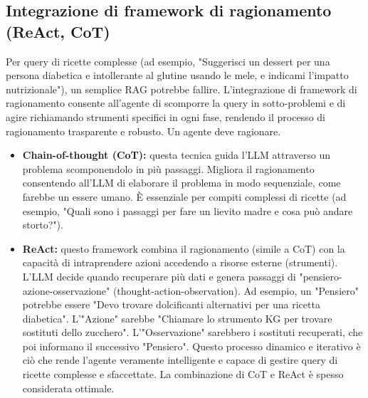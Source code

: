 \documentclass[a4paper, 11pt]{article}
\begin{document}
\subsection{Integrazione di framework di ragionamento (ReAct, CoT)}
Per query di ricette complesse (ad esempio, "Suggerisci un dessert per una persona diabetica e intollerante al glutine usando le mele, e indicami l'impatto nutrizionale"), un semplice RAG potrebbe fallire. L'integrazione di framework di ragionamento consente all'agente di scomporre la query in sotto-problemi e di agire richiamando strumenti specifici in ogni fase, rendendo il processo di ragionamento trasparente e robusto. Un agente deve ragionare. \cite{reasoning_rag_survey}
\begin{itemize}
    \item \textbf{Chain-of-thought (CoT):} questa tecnica guida l'LLM attraverso un problema scomponendolo in più passaggi. \cite{prompt_engineering_explained} Migliora il ragionamento consentendo all'LLM di elaborare il problema in modo sequenziale, come farebbe un essere umano. È essenziale per compiti complessi di ricette (ad esempio, "Quali sono i passaggi per fare un lievito madre e cosa può andare storto?").
    \item \textbf{ReAct:} questo framework combina il ragionamento (simile a CoT) con la capacità di intraprendere azioni accedendo a risorse esterne (strumenti). \cite{prompt_engineering_explained} L'LLM decide quando recuperare più dati e genera passaggi di "pensiero-azione-osservazione" (thought-action-observation). Ad esempio, un "Pensiero" potrebbe essere "Devo trovare dolcificanti alternativi per una ricetta diabetica". L'"Azione" sarebbe "Chiamare lo strumento KG per trovare sostituti dello zucchero". L'"Osservazione" sarebbero i sostituti recuperati, che poi informano il successivo "Pensiero". Questo processo dinamico e iterativo è ciò che rende l'agente veramente intelligente e capace di gestire query di ricette complesse e sfaccettate. La combinazione di CoT e ReAct è spesso considerata ottimale. \cite{prompt_engineering_explained}
\end{itemize}
\end{document}
